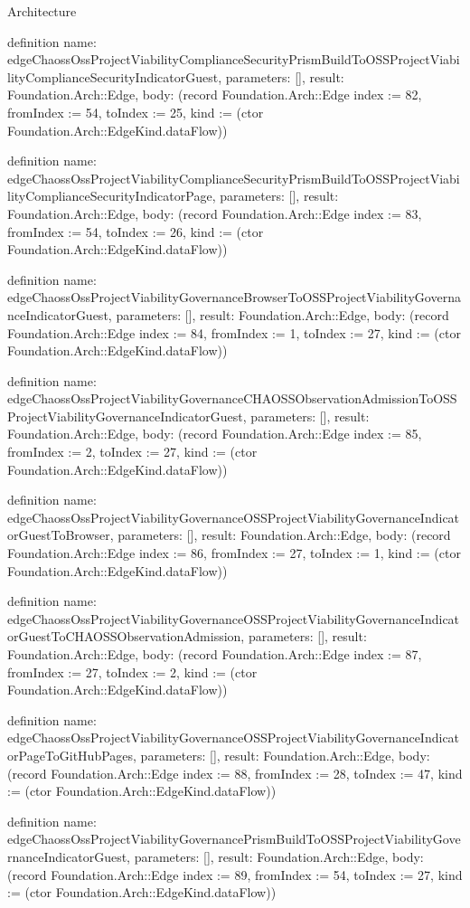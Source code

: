 \begin{lexlean}{Architecture}
\begin{semanticmodule}
definition{
  name: edgeChaossOssProjectViabilityComplianceSecurityPrismBuildToOSSProjectViabilityComplianceSecurityIndicatorGuest,
  parameters: [],
  result: Foundation.Arch::Edge,
  body: (record Foundation.Arch::Edge {index := 82, fromIndex := 54, toIndex := 25, kind := (ctor Foundation.Arch::EdgeKind.dataFlow)})
}

definition{
  name: edgeChaossOssProjectViabilityComplianceSecurityPrismBuildToOSSProjectViabilityComplianceSecurityIndicatorPage,
  parameters: [],
  result: Foundation.Arch::Edge,
  body: (record Foundation.Arch::Edge {index := 83, fromIndex := 54, toIndex := 26, kind := (ctor Foundation.Arch::EdgeKind.dataFlow)})
}

definition{
  name: edgeChaossOssProjectViabilityGovernanceBrowserToOSSProjectViabilityGovernanceIndicatorGuest,
  parameters: [],
  result: Foundation.Arch::Edge,
  body: (record Foundation.Arch::Edge {index := 84, fromIndex := 1, toIndex := 27, kind := (ctor Foundation.Arch::EdgeKind.dataFlow)})
}

definition{
  name: edgeChaossOssProjectViabilityGovernanceCHAOSSObservationAdmissionToOSSProjectViabilityGovernanceIndicatorGuest,
  parameters: [],
  result: Foundation.Arch::Edge,
  body: (record Foundation.Arch::Edge {index := 85, fromIndex := 2, toIndex := 27, kind := (ctor Foundation.Arch::EdgeKind.dataFlow)})
}

definition{
  name: edgeChaossOssProjectViabilityGovernanceOSSProjectViabilityGovernanceIndicatorGuestToBrowser,
  parameters: [],
  result: Foundation.Arch::Edge,
  body: (record Foundation.Arch::Edge {index := 86, fromIndex := 27, toIndex := 1, kind := (ctor Foundation.Arch::EdgeKind.dataFlow)})
}

definition{
  name: edgeChaossOssProjectViabilityGovernanceOSSProjectViabilityGovernanceIndicatorGuestToCHAOSSObservationAdmission,
  parameters: [],
  result: Foundation.Arch::Edge,
  body: (record Foundation.Arch::Edge {index := 87, fromIndex := 27, toIndex := 2, kind := (ctor Foundation.Arch::EdgeKind.dataFlow)})
}

definition{
  name: edgeChaossOssProjectViabilityGovernanceOSSProjectViabilityGovernanceIndicatorPageToGitHubPages,
  parameters: [],
  result: Foundation.Arch::Edge,
  body: (record Foundation.Arch::Edge {index := 88, fromIndex := 28, toIndex := 47, kind := (ctor Foundation.Arch::EdgeKind.dataFlow)})
}

definition{
  name: edgeChaossOssProjectViabilityGovernancePrismBuildToOSSProjectViabilityGovernanceIndicatorGuest,
  parameters: [],
  result: Foundation.Arch::Edge,
  body: (record Foundation.Arch::Edge {index := 89, fromIndex := 54, toIndex := 27, kind := (ctor Foundation.Arch::EdgeKind.dataFlow)})
}


\end{semanticmodule}
\end{lexlean}
